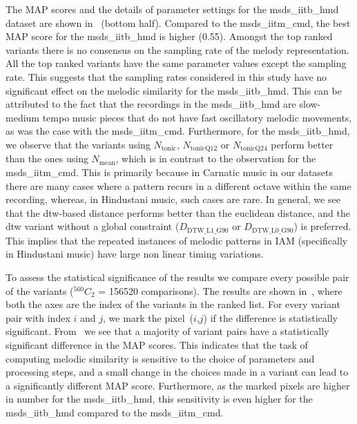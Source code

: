 The MAP scores and the details of parameter settings for the \acrshort{msds_iitb_hmd} dataset are shown in~ (bottom half). Compared to the \acrshort{msds_iitm_cmd}, the best MAP score for the \acrshort{msds_iitb_hmd} is higher (0.55). Amongst the top ranked variants there is no consensus on the sampling rate of the melody representation. All the top ranked variants have the same parameter values except the sampling rate. This suggests that the sampling rates considered in this study have no significant effect on the melodic similarity for the \acrshort{msds_iitb_hmd}. This can be attributed to the fact that the recordings in the \acrshort{msds_iitb_hmd} are slow-medium tempo music pieces that do not have fast oscillatory melodic movements, as was the case with the \acrshort{msds_iitm_cmd}.  Furthermore, for the \acrshort{msds_iitb_hmd}, we observe that the variants using $N_{\mathrm{tonic}}$, $N_{\mathrm{tonicQ12}}$ or $N_{\mathrm{tonicQ24}}$ perform better than the ones using $N_{\mathrm{mean}}$, which is in contrast to the observation for the \acrshort{msds_iitm_cmd}. This is primarily because in Carnatic music in our datasets there are many cases where a pattern recurs in a different octave within the same recording, whereas, in Hindustani music, such cases are rare. In general, we see that the \gls{dtw}-based distance performs better than the euclidean distance, and the \gls{dtw} variant without a global constraint ($D_{\mathrm{DTW\_L1\_G90}}$ or $D_{\mathrm{DTW\_L0\_G90}}$) is preferred. This implies that the repeated instances of melodic patterns in IAM (specifically in Hindustani music) have large non linear timing variations.

To assess the statistical significance of the results we compare every possible pair of the variants ($^{560}C_{2}$ = 156520 comparisons). The results are shown in~, where both the axes are the index of the variants in the ranked list. For every variant pair with index $i$ and $j$, we mark the pixel~($i$,$j$) if the difference is statistically significant. From~ we see that a majority of variant pairs have a statistically significant difference in the MAP scores. This indicates that the task of computing melodic similarity is sensitive to the choice of parameters and processing steps, and a small change in the choices made in a variant can lead to a significantly different MAP score. Furthermore, as the marked pixels are higher in number for the \acrshort{msds_iitb_hmd}, this sensitivity is even higher for the \acrshort{msds_iitb_hmd} compared to the \acrshort{msds_iitm_cmd}.


